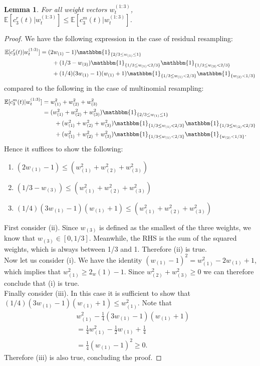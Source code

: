 \documentclass{article}
\newtheorem{lemma}{Lemma}
\newcommand{\E}{\mathbb{E}}
\newcommand{\I}[1]{\mathbbm{1}_{\{#1\}}}
\newcommand{\1}[1]{\mathbbm{1}_{#1}}
\begin{document}
\begin{lemma}
For all weight vectors $w_t^{(1:3)}$, 
$\E[c_3^r(t) |w_t^{(1:3)}] \leq \E[c_3^m(t) |w_t^{(1:3)}]$.
\end{lemma}
\begin{proof}
We have the following expression in the case of residual resampling:
\begin{align*}
\E[c_3^r(t) |w_t^{(1:3)}] &= (2w_{(1)} -1) \I{2/3 \leq w_{(1)} \leq 1} \\
&\qquad + (1/3 - w_{(3)}) \I{1/3 \leq w_{(1)} < 2/3} \I{1/3 \leq w_{(2)} < 2/3} \\
&\qquad + (1/4)(3w_{(1)} -1)(w_{(1)} +1) \I{1/3 \leq w_{(1)} < 2/3} \I{w_{(2)} <1/3}
\end{align*}
compared to the following in the case of multinomial resampling:
\begin{align*}
\E[c_3^m(t) |w_t^{(1:3)}] &= w_{(1)}^2 + w_{(2)}^2 + w_{(3)}^2 \\
&= (w_{(1)}^2 + w_{(2)}^2 + w_{(3)}^2) \I{2/3 \leq w_{(1)} \leq 1} \\
&\qquad + (w_{(1)}^2 + w_{(2)}^2 + w_{(3)}^2) \I{1/3 \leq w_{(1)} < 2/3} \I{1/3 \leq w_{(2)} < 2/3} \\
&\qquad + (w_{(1)}^2 + w_{(2)}^2 + w_{(3)}^2) \I{1/3 \leq w_{(1)} < 2/3} \I{w_{(2)} <1/3}.
\end{align*}
Hence it suffices to show the following:
\begin{enumerate}[label=(\roman*)]
\item $(2w_{(1)} -1) \leq (w_{(1)}^2 + w_{(2)}^2 + w_{(3)}^2)$
\item $ (1/3 - w_{(3)}) \leq (w_{(1)}^2 + w_{(2)}^2 + w_{(3)}^2)$
\item $ (1/4)(3w_{(1)} -1)(w_{(1)} +1) \leq (w_{(1)}^2 + w_{(2)}^2 + w_{(3)}^2)$\\
\end{enumerate}
First consider (ii). Since $w_{(3)}$ is defined as the smallest of the three weights, we know that $w_{(3)} \in [0,1/3]$. Meanwhile, the RHS is the sum of the squared weights, which is always between 1/3 and 1. Therefore (ii) is true.\\[7pt]
Now let us consider (i). We have the identity $(w_{(1)} -1)^2 = w_{(1)}^2 -2w_{(1)} +1$, which implies that $w_{(1)}^2 \geq 2_w{(1)} - 1$. Since $w_{(2)}^2 + w_{(3)}^2 \geq 0$ we can therefore conclude that (i) is true.\\[7pt]
Finally consider (iii). In this case it is sufficient to show that $(1/4)(3w_{(1)} -1)(w_{(1)} +1) \leq w_{(1)}^2$. Note that
\begin{align*}
& w_{(1)}^2 - \frac{1}{4}(3w_{(1)} -1)(w_{(1)} +1) \\
& = \frac{1}{4} w_{(1)}^2- \frac{1}{2} w_{(1)} + \frac{1}{4} \\
& = \frac{1}{4} (w_{(1)} -1)^2 \geq 0.
\end{align*}
Therefore (iii) is also true, concluding the proof.
\end{proof}
\end{document}
